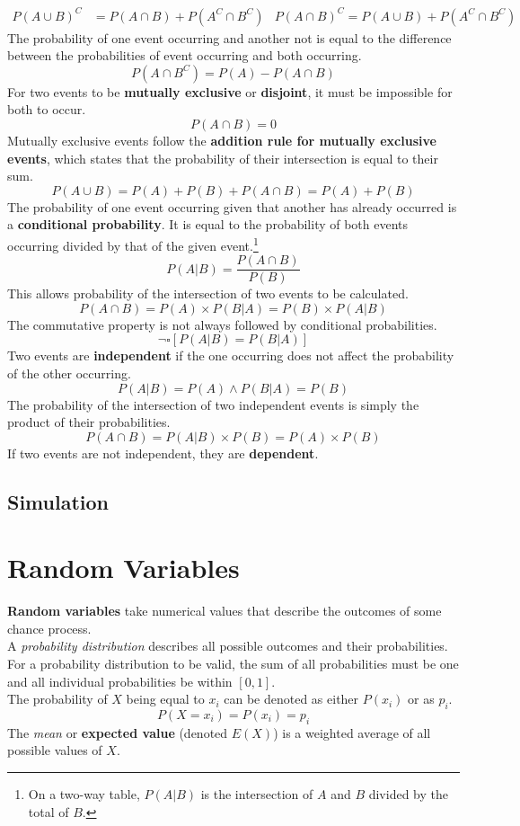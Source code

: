 \documentclass[../AP_Statistics.tex]{subfiles}
\begin{document}
		\begin{align*}
			P(A\cup B)^C &= P(A\cap B) + P\left(A^C\cap B^C\right)	& P(A\cap B)^C = P(A\cup B) + P\left(A^C \cap B^C\right)
			\end{align*}
		The probability of one event occurring and another not is equal to the difference between the probabilities of event occurring and both occurring.
		\[P\left(A\cap B^C\right) = P(A) - P(A\cap B)\]
		For two events to be \textbf{mutually exclusive} or \textbf{disjoint}, it must be impossible for both to occur.
		\[P(A\cap B) = 0\]
		Mutually exclusive events follow the \textbf{addition rule for mutually exclusive events}, which states that the probability of their intersection is equal to their sum.
		\[P(A\cup B) = P(A) + P(B) + P(A\cap B) = P(A) + P(B)\]
		The probability of one event occurring given that another has already occurred is a \textbf{conditional probability}. It is equal to the probability of both events occurring divided by that of the given event.\footnote{On a two-way table, $P(A|B)$ is the intersection of $A$ and $B$ divided by the total of $B$.}
		\[P(A|B) = \frac{P(A\cap B)}{P(B)}\]
		This allows probability of the intersection of two events to be calculated.
		\[P(A\cap B) = P(A) \times P(B|A) = P(B) \times P(A|B)\]
		The commutative property is not always followed by conditional probabilities.
		\[\lnot\square[P(A|B) = P(B|A)]\]
		Two events are \textbf{independent} if the one occurring does not affect the probability of the other occurring.
		\[P(A|B) = P(A) \land P(B|A) = P(B)\]
		The probability of the intersection of two independent events is simply the product of their probabilities.
		\[P(A\cap B) = P(A|B) \times P(B) = P(A) \times P(B)\]
		If two events are not independent, they are \textbf{dependent}.
		\section*{Simulation}
	\chapter{Random Variables}
		\textbf{Random variables} take numerical values that describe the outcomes of some chance process. \\
		A \emph{probability distribution} describes all possible outcomes and their probabilities. \\
		For a probability distribution to be valid, the sum of all probabilities must be one and all individual probabilities be within $[0,1]$. \\
		The probability of $X$ being equal to $x_i$ can be denoted as either $P(x_i)$ or as $p_i$.
		\[P(X = x_i) = P(x_i) = p_i\]
		The \emph{mean} or \textbf{expected value} (denoted $E(X)$) is a weighted average of all possible values of $X$.
\end{document}
